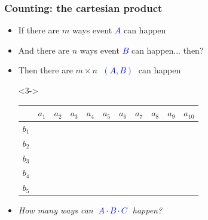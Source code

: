 \documentclass[xcolor={dvipsnames}]{beamer}
\begin{document}
\frame
{
 \frametitle{Counting: the cartesian product}

\begin{itemize}
\item If there are $m$ ways event \textcolor{blue}{$A$} can happen
\item And there are $n$ ways event \textcolor{blue}{$B$} can happen... then?
\item<2->[] Then there are $m\times n$ \textcolor{blue}{$\;(A, B)\;$} can happen
\item[]
\item[]<3-> 
\begin{tabular}{|c|c|c|c|c|c|c|c|c|c|c|}
\hline
& $a_1$ & $a_2$ & $a_3$ & $a_4$ & $a_5$ & $a_6$ & $a_7$ & $a_8$ & $a_9$ & $a_{10}$ \\\hline
$b_1$&&&&&&&&&&\\\hline
$b_2$&&&&&&&&&&\\\hline
$b_3$&&&&&&&&&&\\\hline
$b_4$&&&&&&&&&&\\\hline
$b_5$&&&&&&&&&&\\\hline
\end{tabular}

\item[]
\item<4-> \emph{How many ways can \textcolor{blue}{$\;A\cdot B \cdot C\;$} happen?}

\end{itemize}
}
\end{document}
